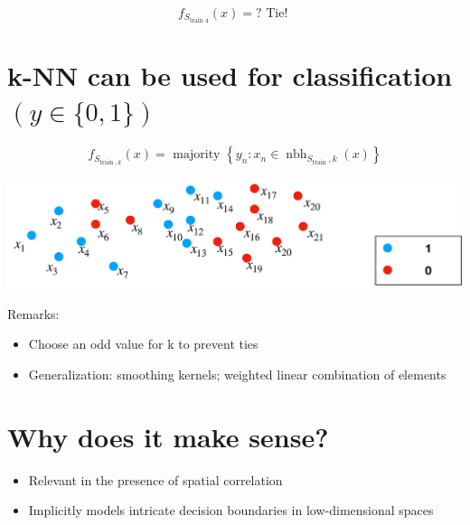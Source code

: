\documentclass[10pt]{article}
\begin{document}
$$
f_{S_{\text {train } 4}}(x)=? \text { Tie! }
$$

\section*{k-NN can be used for classification $(y \in\{0,1\})$}
$$
f_{S_{\text {train }, k}}(x)=\text { majority }\left\{y_{n}: x_{n} \in \operatorname{nbh}_{S_{\text {train }}, k}(x)\right\}
$$

\begin{center}
\includegraphics[max width=\textwidth]{2023_12_30_f937b0007b5d87b39f79g-20}
\end{center}

Remarks:

\begin{itemize}
  \item Choose an odd value for $\mathrm{k}$ to prevent ties
  \item Generalization: smoothing kernels; weighted linear combination of elements
\end{itemize}

\section*{Why does it make sense?}
\begin{itemize}
  \item Relevant in the presence of spatial correlation

  \item Implicitly models intricate decision boundaries in low-dimensional spaces

\end{itemize}
\end{document}
